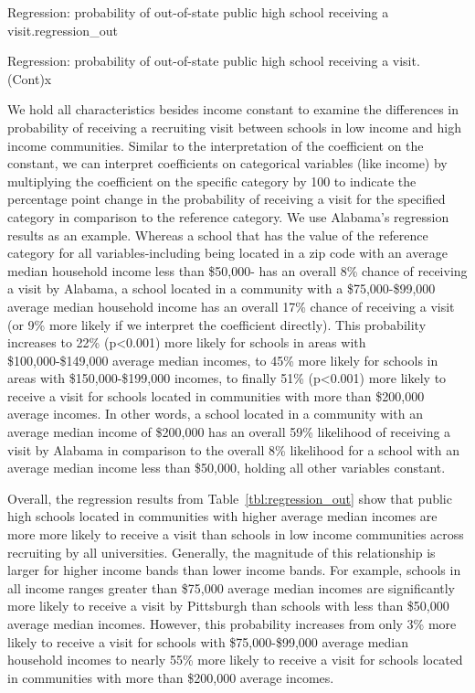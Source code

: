 \documentclass[twoside]{article}
\begin{document}
\begin{lscape-env}[8]{Regression: probability of out-of-state public high school receiving a visit.}{regression_out}
  
\end{lscape-env}

 \begin{lscape-env}[8]{Regression: probability of out-of-state public high school receiving a visit. (Cont)}{x}
  
\end{lscape-env}

We hold all characteristics besides income constant to examine the differences in probability of receiving a recruiting visit between schools in low income and high income communities. Similar to the interpretation of the coefficient on the constant, we can interpret coefficients on categorical variables (like income) by multiplying the coefficient on the specific category by 100 to indicate the percentage point change in the probability of receiving a visit for the specified category in comparison to the reference category. We use Alabama's regression results as an example. Whereas a school that has the value of the reference category for all variables-including being located in a zip code with an average median household income less than \$50,000- has an overall 8\% chance of receiving a visit by Alabama, a school located in a community with a \$75,000-\$99,000 average median household income has an overall 17\% chance of receiving a visit (or 9\% more likely if we interpret the coefficient directly).  This probability increases to 22\%  (p<0.001) more likely for schools in areas with \$100,000-\$149,000 average median incomes, to 45\% more likely for schools in areas with \$150,000-\$199,000 incomes, to finally 51\% (p<0.001) more likely to receive a visit for schools located in communities with more than \$200,000 average incomes. In other words, a school located in a community with an average median income of \$200,000 has an overall 59\% likelihood of receiving a visit by Alabama in comparison to the overall 8\% likelihood for a school with an average median income less than \$50,000, holding all other variables constant.

Overall, the regression results from Table~\ref{tbl:regression_out} show that public high schools located in communities with higher average median incomes are more more likely to receive a visit than schools in low income communities across recruiting by all universities. Generally, the magnitude of this relationship is larger for higher income bands than lower income bands. For example, schools in all income ranges greater than \$75,000 average median incomes are significantly more likely to receive a visit by Pittsburgh than schools with less than \$50,000 average median incomes. However, this probability increases from only 3\% more likely to receive a visit for schools with \$75,000-\$99,000 average median household incomes to nearly 55\% more likely to receive a visit for schools located in communities with more than \$200,000 average incomes. 
\end{document}
